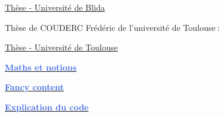 \documentclass{article}
\begin{document}
\begin{tcolorbox}[colback=white, colframe=gray]
  \normalsize\hypersetup{urlcolor=blue}
  \href{https://di.univ-blida.dz/jspui/bitstream/123456789/9666/1/32-530-642-1.pdf}{Thèse - Université de Blida}
\end{tcolorbox}

\vspace{2em}

\large Thèse de COUDERC Frédéric de l'université de Toulouse$ \ $:

\begin{tcolorbox}[colback=white, colframe=gray]
  \normalsize\hypersetup{urlcolor=blue}
  \href{https://theses.hal.science/tel-00143709}{Thèse - Université de Toulouse}
\end{tcolorbox}

\vspace{2em}

\begin{tcolorbox}[colback=lightgray!30, colframe=black]
\begin{center}
\hypersetup{pdfnewwindow=true}
\href{Maths et Notions.pdf}{\Large \textcolor{RoyalBlue}{\textbf{Maths et notions}}}
\end{center}
\end{tcolorbox}
\vspace{2mm}
\begin{tcolorbox}[colback=lightgray!30, colframe=black]
\begin{center}
\hypersetup{pdfnewwindow=true}
\href{Fancy_content_TIPE.pdf}{\Large \textcolor{RoyalBlue}{\textbf{Fancy content}}}
\end{center}
\end{tcolorbox}

\vspace{2mm}
\begin{tcolorbox}[colback=lightgray!30, colframe=black]
\begin{center}
\hypersetup{pdfnewwindow=true}
\href{Explication_code.pdf}{\Large \textcolor{RoyalBlue}{\textbf{Explication du code}}}
\end{center}
\end{tcolorbox}
\end{document}
